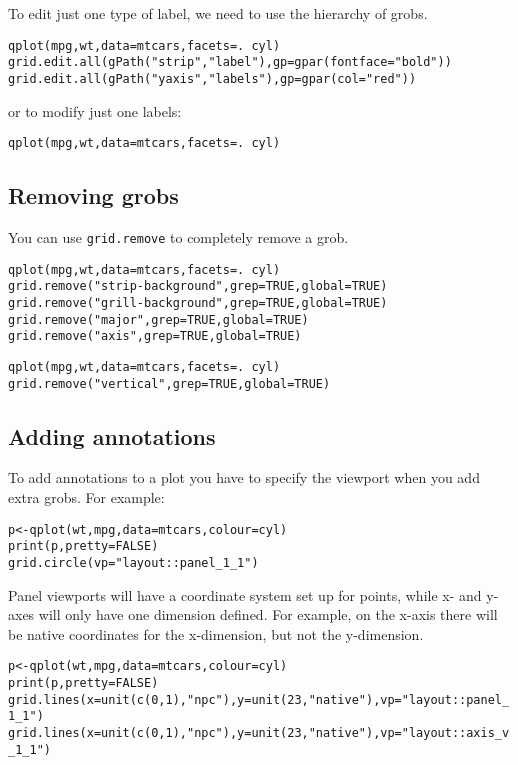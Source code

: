 
To edit just one type of label, we need to use the hierarchy of grobs.

\begin{alltt}
qplot(mpg, wt, data=mtcars, facets = . ~ cyl)
grid.edit.all(gPath("strip","label"), gp=gpar(fontface="bold"))
grid.edit.all(gPath("yaxis", "labels"), gp=gpar(col="red"))
\end{alltt}

or to modify just one labels:

\begin{alltt}
qplot(mpg, wt, data=mtcars, facets = . ~ cyl)
\end{alltt}

\subsection{Removing grobs}\label{ssub:removing_grobs}

You can use {\tt grid.remove} to completely remove a grob.

\begin{alltt}
qplot(mpg, wt, data=mtcars, facets = . ~ cyl)
grid.remove("strip-background", grep=TRUE, global=TRUE)
grid.remove("grill-background", grep=TRUE, global=TRUE)
grid.remove("major", grep=TRUE, global=TRUE)
grid.remove("axis", grep=TRUE, global=TRUE)

qplot(mpg, wt, data=mtcars, facets = . ~ cyl)
grid.remove("vertical", grep=TRUE, global=TRUE)
\end{alltt}

\subsection{Adding annotations}\label{sec:adding_annotation}

To add annotations to a plot you have to specify the viewport when you add extra grobs.  For example:

\begin{alltt}
p <- qplot(wt, mpg, data=mtcars, colour=cyl)
print(p, pretty=FALSE)
grid.circle(vp="layout::panel_1_1")
\end{alltt}

Panel viewports will have a coordinate system set up for points, while x- and y- axes will only have one dimension defined.  For example, on the x-axis there will be native coordinates for the x-dimension, but not the y-dimension.

\begin{alltt}
p <- qplot(wt, mpg, data=mtcars, colour=cyl)
print(p, pretty=FALSE)
grid.lines(x=unit(c(0,1), "npc"), y=unit(23, "native"), vp="layout::panel_1_1")
grid.lines(x=unit(c(0,1), "npc"), y=unit(23, "native"), vp="layout::axis_v_1_1")
\end{alltt}

